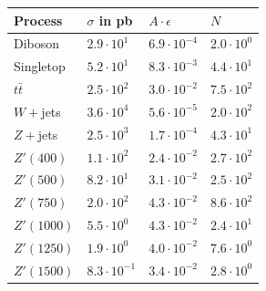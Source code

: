 \begin{table}[H]
 \begin{tabular}{l|l|l|l}
 Process & $\sigma$ in pb& $A\cdot \epsilon$ & $N$\\
 \hline
Diboson &$2.9\cdot 10^{1}$&$6.9\cdot 10^{-4}$ &$2.0\cdot 10^{0}$ \\
Singletop&$5.2\cdot 10^{1}$&$8.3\cdot 10^{-3}$ &$4.4\cdot 10^{1}$\\
$t\bar t$&$2.5\cdot 10^{2}$&$3.0\cdot 10^{-2}$ &$7.5\cdot 10^{2}$\\
$W+$jets&$3.6\cdot 10^{4}$&$5.6\cdot 10^{-5}$ &$2.0\cdot 10^{2}$\\
$Z+$jets&$2.5\cdot 10^{3}$&$1.7\cdot 10^{-4}$ &$4.3\cdot 10^{1}$\\
\hline
$Z'(400)$&$1.1\cdot 10^{2}$&$2.4\cdot 10^{-2}$ &$2.7\cdot 10^{2}$\\
$Z'(500)$&$8.2\cdot 10^{1}$&$3.1\cdot 10^{-2}$ &$2.5\cdot 10^{2}$\\
$Z'(750)$&$2.0\cdot 10^{2}$&$4.3\cdot 10^{-2}$ &$8.6\cdot 10^{2}$\\
$Z'(1000)$&$5.5\cdot 10^{0}$&$4.3\cdot 10^{-2}$ &$2.4\cdot 10^{1}$\\
$Z'(1250)$&$1.9\cdot 10^{0}$&$4.0\cdot 10^{-2}$ &$7.6\cdot 10^{0}$\\
$Z'(1500)$&$8.3\cdot 10^{-1}$&$3.4\cdot 10^{-2}$ &$2.8\cdot 10^{0}$\\

\end{tabular}
\end{table}

